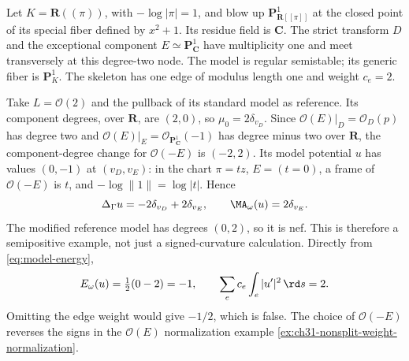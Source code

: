 \begin{example}
\label{ex:ch26-nonsplit-weighted-energy}
Let \(K=\mathbf R((\pi))\), with \(-\log|\pi|=1\), and blow up
\(\mathbf P^1_{\mathbf R[[\pi]]}\) at the closed point of its special
fiber defined by \(x^2+1\).  Its residue field is \(\mathbf C\).
The strict transform \(D\) and the exceptional component
\(E\simeq\mathbf P^1_{\mathbf C}\) have multiplicity one and meet
transversely at this degree-two node.  The model is regular semistable;
its generic fiber is \(\mathbf P^1_K\).  The skeleton has one edge of
modulus length one and weight \(c_e=2\).

Take \(L=\mathcal O(2)\) and the pullback of its standard model as
reference.  Its component degrees, over \(\mathbf R\), are \((2,0)\),
so \(\mu_0=2\delta_{v_D}\).  Since
\(\mathcal O(E)|_D=\mathcal O_D(p)\) has degree two and
\(\mathcal O(E)|_E=\mathcal O_{\mathbf P^1_{\mathbf C}}(-1)\) has
degree minus two over \(\mathbf R\), the component-degree change for
\(\mathcal O(-E)\) is \((-2,2)\).  Its model potential \(u\) has
values \((0,-1)\) at \((v_D,v_E)\): in the chart \(\pi=t z\),
\(E=(t=0)\), a frame of \(\mathcal O(-E)\) is \(t\), and
\(-\log\lVert1\rVert=\log|t|\).
Hence
\[
 \Delta_\Gamma u=-2\delta_{v_D}+2\delta_{v_E},\qquad
 \MA_\omega(u)=2\delta_{v_E}.
\]
The modified reference model has degrees \((0,2)\), so it is nef.
This is therefore a semipositive example, not just a signed-curvature
calculation.  Directly from \eqref{eq:model-energy},
\[
 E_\omega(u)=\tfrac12(0-2)=-1,
 \qquad
 \sum_e c_e\int_e|u'|^2\,\rd s=2.
\]
Omitting the edge weight would give \(-1/2\), which is false.
The choice of \(\mathcal O(-E)\) reverses the signs in the
\(\mathcal O(E)\) normalization example
\cref{ex:ch31-nonsplit-weight-normalization}.
\end{example}


